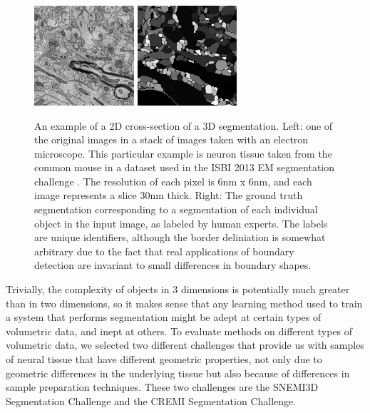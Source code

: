 \begin{figure}[h]
    \centering
	\includegraphics[width=0.33\textwidth]{img/snemi3d_raw_example}
	\hspace{1cm}
	\includegraphics[width=0.33\textwidth]{img/snemi3d_label_example}
    \caption{An example of a 2D cross-section of a 3D segmentation. Left: one of the original images in a stack of images taken with an electron microscope. This particular example is neuron tissue taken from the common mouse in a dataset used in the ISBI 2013 EM segmentation challenge \cite{Kasthuri2015}. The resolution of each pixel is 6nm x 6nm, and each image represents a slice 30nm thick. Right: The ground truth segmentation corresponding to a segmentation of each individual object in the input image, as labeled by human experts. The labels are unique identifiers, although the border deliniation is somewhat arbitrary due to the fact that real applications of boundary detection are invariant to small differences in boundary shapes.}
    \label{fig:snemi3d_example}
\end{figure}

Trivially, the complexity of objects in 3 dimensions is potentially much greater than in two dimensions, so it makes sense that any learning method used to train a system that performs segmentation might be adept at certain types of volumetric data, and inept at others. To evaluate methods on different types of volumetric data, we selected two different challenges that provide us with samples of neural tissue that have different geometric properties, not only due to geometric differences in the underlying tissue but also because of differences in sample preparation techniques. These two challenges are the SNEMI3D Segmentation Challenge and the CREMI Segmentation Challenge.

